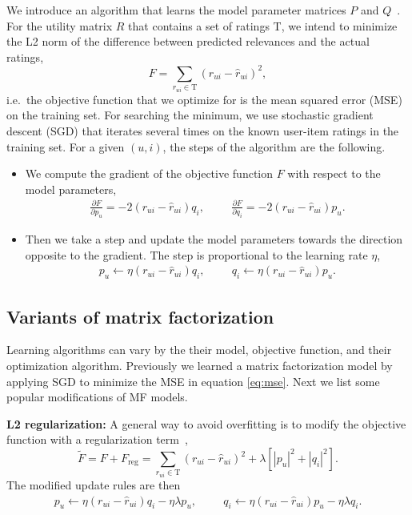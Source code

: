 \documentclass[10pt]{article}
\newenvironment{myitemize}{\begin{itemize} \setlength{\topsep}{0pt} \setlength{\itemsep}{0pt} \setlength{\parskip}{0pt} \setlength{\parsep}{0pt}}{  \end{itemize} }
\begin{document}
We introduce an algorithm that learns the model parameter matrices $P$ and $Q$~\cite{koren2009matrix}.
For the utility matrix $R$ that contains a set of ratings T, we intend to minimize the L2 norm of the difference between predicted relevances and the actual ratings,
\begin{equation}
F = \displaystyle\sum_{r_{ui} \in \text{T}} \left ( r_{ui} - \hat{r}_{ui} \right ) ^ 2,
\label{eq:mse}
\end{equation} 
i.e.\ the objective function that we optimize for is the mean squared error (MSE) on the training set.
For searching the minimum, we use stochastic gradient descent (SGD) that iterates several times on the known user-item ratings in the training set.
For a given $(u,i)$, the steps of the algorithm are the following.
\begin{myitemize}
\item We compute the gradient of the objective function $F$ with respect to the model parameters,
\begin{gather}
	\frac{\partial F}{\partial p_u} =   - 2 (r_{ui} - \hat{r}_{ui}) q_i, \hspace{1cm}
	\frac{\partial F}{\partial q_i} =   - 2 (r_{ui} - \hat{r}_{ui}) p_u.
\end{gather}
\item Then we take a step and update the model parameters towards the direction opposite to the gradient. The step is proportional to the learning rate $\eta$,
\begin{gather}
	p_u \leftarrow  \eta (r_{ui} - \hat{r}_{ui}) q_i, \hspace{1cm}
	q_i \leftarrow  \eta (r_{ui} - \hat{r}_{ui}) p_u.
\end{gather}
\end{myitemize}

\subsection{Variants of matrix factorization}
\label{sec:mf-variants}

Learning algorithms can vary by the their model, objective function, and their optimization algorithm.
Previously we learned a matrix factorization model by applying SGD to minimize the MSE in equation \eqref{eq:mse}.
Next we list some popular modifications of MF models.

\textbf{L2 regularization:}  A general way to avoid overfitting is to modify the objective function with a regularization term~\cite{koren2009matrix},
\begin{equation}
	\tilde{F} = F + F_{\text{reg}} = \displaystyle\sum_{r_{ui} \in \text{T}} \left ( r_{ui} - \hat{r}_{ui} \right ) ^ 2 + \lambda \left [ |p_u|^2 + |q_i|^2 \right ].
	\label{eq:obj-reg}
\end{equation}
The modified update rules are then
\begin{gather}
	p_u \leftarrow  \eta (r_{ui} - \hat{r}_{ui}) q_i - \eta \lambda p_u, \hspace{1cm}
	q_i \leftarrow  \eta (r_{ui} - \hat{r}_{ui}) p_u - \eta \lambda q_i.
\end{gather}
\end{document}
